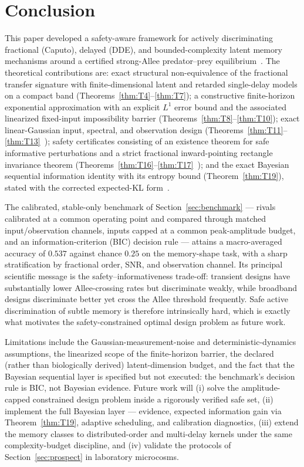 \section{Conclusion}
\label{sec:conclusion}

This paper developed a safety-aware framework for actively discriminating fractional (Caputo), delayed (DDE), and bounded-complexity latent memory mechanisms around a certified strong-Allee predator--prey equilibrium~\cite{F01,F02,F03,F04,P01}. The theoretical contributions are: exact structural non-equivalence of the fractional transfer signature with finite-dimensional latent and retarded single-delay models on a compact band (Theorems~\ref{thm:T4}--\ref{thm:T7}); a constructive finite-horizon exponential approximation with an explicit $L^1$ error bound and the associated linearized fixed-input impossibility barrier (Theorems~\ref{thm:T8}--\ref{thm:T10}); exact linear-Gaussian input, spectral, and observation design (Theorems~\ref{thm:T11}--\ref{thm:T13}~\cite{O01,O02,S03}); safety certificates consisting of an existence theorem for safe informative perturbations and a strict fractional inward-pointing rectangle invariance theorem (Theorems~\ref{thm:T16}--\ref{thm:T17}~\cite{E03,E04,E05}); and the exact Bayesian sequential information identity with its entropy bound (Theorem~\ref{thm:T19}), stated with the corrected expected-KL form~\cite{O05,O06,O07,O09}.

The calibrated, stable-only benchmark of Section~\ref{sec:benchmark} --- rivals calibrated at a common operating point and compared through matched input/observation channels, inputs capped at a common peak-amplitude budget, and an information-criterion (BIC) decision rule --- attains a macro-averaged accuracy of $0.537$ against chance $0.25$ on the memory-shape task, with a sharp stratification by fractional order, SNR, and observation channel. Its principal scientific message is the safety--informativeness trade-off: transient designs have substantially lower Allee-crossing rates but discriminate weakly, while broadband designs discriminate better yet cross the Allee threshold frequently. Safe active discrimination of subtle memory is therefore intrinsically hard, which is exactly what motivates the safety-constrained optimal design problem as future work.

Limitations include the Gaussian-measurement-noise and deterministic-dynamics assumptions, the linearized scope of the finite-horizon barrier, the declared (rather than biologically derived) latent-dimension budget, and the fact that the Bayesian sequential layer is specified but not executed: the benchmark's decision rule is BIC, not Bayesian evidence. Future work will (i) solve the amplitude-capped constrained design problem inside a rigorously verified safe set, (ii) implement the full Bayesian layer --- evidence, expected information gain via Theorem~\ref{thm:T19}, adaptive scheduling, and calibration diagnostics, (iii) extend the memory classes to distributed-order and multi-delay kernels under the same complexity-budget discipline, and (iv) validate the protocols of Section~\ref{sec:prospect} in laboratory microcosms.
